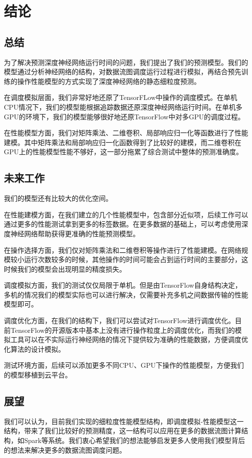 \chapter{结论}
\section{总结}
\label{cha:conc}
    为了解决预测深度神经网络运行时间的问题，我们提出了我们的预测模型。我们的模型通过分析神经网络的结构，对数据流图调度运行过程进行模拟，再结合预先训练的操作性能模型的方式实现了深度神经网络的静态细粒度预测。
    
    在调度模拟层面，我们非常好地还原了TensorFLow中操作的调度模式。在单机CPU情况下，我们的模型能根据追踪数据还原深度神经网络运行时间。在单机多GPU的环境下，我们的模型能够很好地还原TensorFlow中对多GPU的调度过程。
    
    在性能模型方面，我们对矩阵乘法、二维卷积、局部响应归一化等函数进行了性能建模。其中矩阵乘法和局部响应归一化函数得到了比较好的建模，而二维卷积在GPU上的性能模型性能不够好，这一部分拖累了综合测试中整体的预测准确度。
    
\section{未来工作}
    我们的模型还有比较大的优化空间。
    
    在性能建模方面，在我们建立的几个性能模型中，包含部分近似项，后续工作可以通过更多的性能测试拿到更多的标签数据。在更多数据的基础上，可以考虑使用深度神经网络帮助获得更准确的性能预测模型。
    
    在操作选择方面，我们仅对矩阵乘法和二维卷积等操作进行了性能建模。在网络规模较小运行次数较多的时候，其他操作的时间可能会占到运行时间的主要部分，这时候我们的模型会出现明显的精度损失。
    
    调度模拟方面，我们的测试仅仅局限于单机。但是由TensorFlow自身结构决定，多机的情况我们的模型实际也可以进行解决，仅需要补充多机之间数据传输的性能模型即可。
    
    调度优化方面，在我们的结构下，我们可以尝试对TensorFlow进行调度优化。目前TensorFlow的开源版本中基本上没有进行操作粒度上的调度优化，而我们的模拟工具可以在不实际运行神经网络的情况下提供较为准确的性能数据，方便调度优化算法的设计模拟。
    
    测试环境方面，后续可以添加更多不同CPU、GPU下操作的性能模型，方便我们的模型移植到云平台。
    
\section{展望}

    我们可以认为，目前我们实现的细粒度性能模型结构，即调度模拟-性能模型这一结构，带来了我们比较好的预测精度，这一结构可以应用在更多的数据流图计算结构，如Spark\cite{rdd}等系统。我们衷心希望我们的想法能够启发更多人使用我们模型背后的想法来解决更多的数据流图调度问题。
